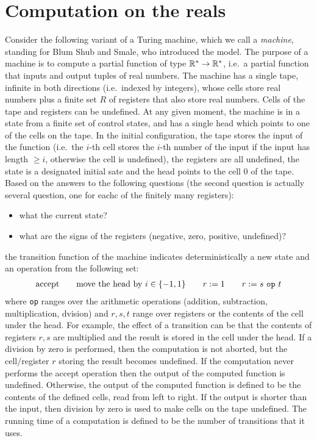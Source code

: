 \section{Computation on the reals}
\label{sec:bss}
Consider the following variant of a Turing machine, which we call a \emph{\bss machine}, standing for Blum Shub and Smale, who introduced the model. The purpose of a  \bss machine is to compute a  partial function  of type $\mathbb R^* \to \mathbb R^*$, i.e.~a partial function that inputs and output tuples of real numbers. The machine has a single tape, infinite in both directions (i.e.~indexed by integers), whose  cells store real numbers  plus a finite set $R$ of registers that also store real numbers. Cells of the tape and registers can be undefined.  At any given moment, the machine  is in a state  from a finite set of control states, and has a single head which points to one of the cells on the tape. In the initial configuration,  the tape stores the input of the function (i.e.~the $i$-th cell stores the $i$-th number of the input if the input has length $\ge i$, otherwise the cell is undefined), the registers are all undefined, the state is a  designated initial sate and the head points to the cell $0$ of the tape. Based on the answers to the following questions (the second question is actually several question, one for eachc of the finitely many registers):
\begin{itemize}
	\item what  the current state?
	\item what are the signs of the registers (negative, zero, positive, undefined)?
\end{itemize}
the transition function of the machine indicates deterministically a new state and  an operation from the following set:
\begin{align*}
\text{accept} \qquad \text{move the head by } i \in \{-1,1\} \qquad   r := 1 \qquad  r := s\  \mathtt{op}\  t 
\end{align*}
where {\tt op} ranges over the arithmetic operations (addition, subtraction, multiplication, dvision) and $r,s,t$ range over registers or the contents of the cell under the head. For example, the effect of a transition can be that the contents of registers $r,s$ are multiplied and the result is stored in the cell under the head. If a division by zero is performed, then the computation is not aborted, but the cell/register $r$ storing the result becomes undefined. If the computation never performs the accept operation  then  the output of the computed  function is undefined. Otherwise, the output of the computed function is defined to be the contents of the defined cells, read from left to right. If the output is shorter than the input, then division by zero is used to make cells on the tape  undefined. The running time of a computation is defined to be the number of transitions that it uses.



